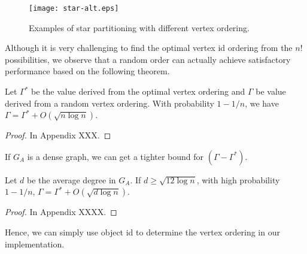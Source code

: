 \begin{figure}[h]
\centering
\texttt{[image: star-alt.eps]}
\caption{Examples of star partitioning with different vertex ordering.}
\label{fig:star-alt}
\end{figure}



Although it is very challenging to find the optimal vertex id ordering from the $n!$ possibilities, we observe that a random order can actually achieve satisfactory performance based on the following theorem.



\begin{theorem}
\label{THM:SPM_LB}
Let $\Gamma^*$ be the value derived from the optimal vertex ordering and  $\Gamma$ be value derived from a random vertex ordering. With probability $1-1/n$, we have $\Gamma = \Gamma^* + O(\sqrt{n \log n})$.
\end{theorem}
\begin{proof}
In Appendix XXX.
\end{proof}
If $G_A$ is a dense graph, we can get a tighter bound for $(\Gamma - \Gamma^*)$.
\begin{theorem}
\label{THM:SPM_LB_INC}
Let $d$ be the average degree in $G_A$. If $d\geq \sqrt{12\log n}$, with
high probability $1-1/n$, $\Gamma = \Gamma^* + O(\sqrt{d\log n})$.
\end{theorem}
\begin{proof}
In Appendix XXXX.
\end{proof}
Hence, we can simply use object id to determine the vertex ordering in our implementation.



